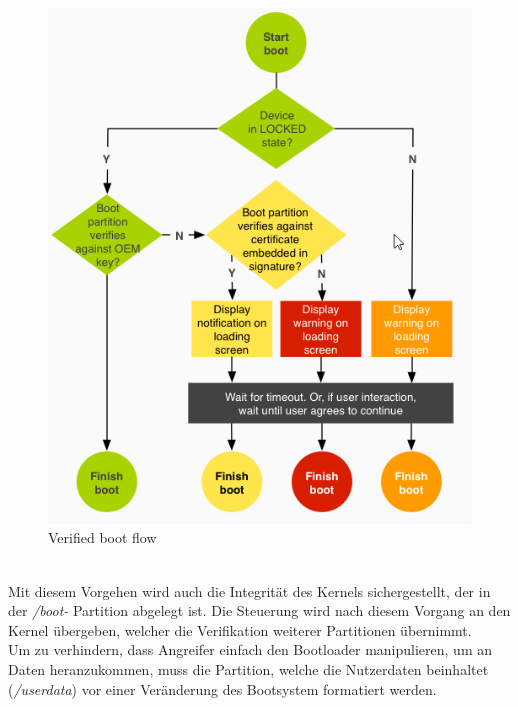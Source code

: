 	\begin{figure}[h]
		\centering
		\includegraphics[width=0.7\linewidth, height=0.5\textheight]{android_pages/graphics/VerifiedBoot}
		\caption[Verified boot flow\protect\cite{VerifyingBoot}]{Verified boot flow
		\cite{VerifyingBoot}}
		\label{fig:VerifiedBoot}
	\end{figure}
	\\
	Mit diesem Vorgehen wird auch die Integrität des Kernels sichergestellt, der
	in der \textit{/boot-} Partition abgelegt ist. Die Steuerung wird nach diesem
	Vorgang an den Kernel übergeben, welcher die Verifikation weiterer Partitionen
	übernimmt.\\
	Um zu verhindern, dass Angreifer einfach den Bootloader manipulieren, um an
	Daten heranzukommen, muss die Partition, welche die Nutzerdaten beinhaltet
	(\textit{/userdata}) vor einer Veränderung des Bootsystem formatiert
	werden.
	
